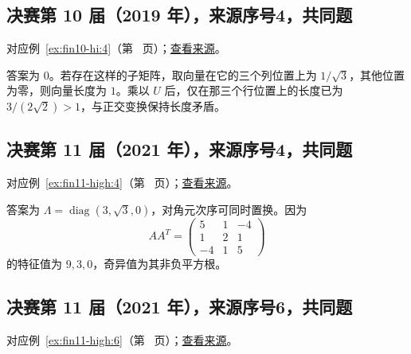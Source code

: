 \documentclass[UTF8,12pt,a4paper,fontset=fandol]{ctexart}
\begin{document}
\subsection{决赛第 10 届（2019 年），来源序号4，共同题}\label{ans:fin10-hi:4}\label{pr:fin10-hi:4}

对应例~\ref{ex:fin10-hi:4}（第~\pageref{ex:fin10-hi:4} 页）；\href{https://github.com/lzxcr/cmc-mathematics/blob/64916fa1fdbc3e444a652eca204d5669058ee321/src/problems/finals/10/04.md}{查看来源}。

\begin{solve}

答案为 $0$。若存在这样的子矩阵，取向量在它的三个列位置上为 $1/\sqrt3$，其他位置为零，则向量长度为 $1$。乘以 $U$ 后，仅在那三个行位置上的长度已为 $3/(2\sqrt2)>1$，与正交变换保持长度矛盾。

\end{solve}

\subsection{决赛第 11 届（2021 年），来源序号4，共同题}\label{ans:fin11-high:4}\label{pr:fin11-high:4}

对应例~\ref{ex:fin11-high:4}（第~\pageref{ex:fin11-high:4} 页）；\href{https://github.com/lzxcr/cmc-mathematics/blob/64916fa1fdbc3e444a652eca204d5669058ee321/src/problems/finals/11/04.md}{查看来源}。

\begin{solve}

答案为 $\Lambda=\operatorname{diag}(3,\sqrt3,0)$，对角元次序可同时置换。因为
\[
AA^T=\begin{pmatrix}5&1&-4\\1&2&1\\-4&1&5\end{pmatrix}
\]
的特征值为 $9,3,0$，奇异值为其非负平方根。

\end{solve}

\subsection{决赛第 11 届（2021 年），来源序号6，共同题}\label{ans:fin11-high:6}\label{pr:fin11-high:6}

对应例~\ref{ex:fin11-high:6}（第~\pageref{ex:fin11-high:6} 页）；\href{https://github.com/lzxcr/cmc-mathematics/blob/64916fa1fdbc3e444a652eca204d5669058ee321/src/problems/finals/11/06.md}{查看来源}。
\end{document}
